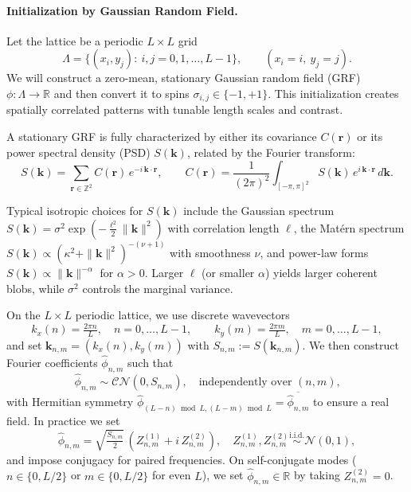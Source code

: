 \documentclass[11pt,a4paper]{article}
\begin{document}
\paragraph{Initialization by Gaussian Random Field.}
Let the lattice be a periodic $L\times L$ grid
\begin{equation}
    \Lambda=\{(x_i,y_j):\ i,j=0,1,\dots,L-1\},\qquad (x_i=i,\ y_j=j).
\end{equation}
We will construct a zero-mean, stationary Gaussian random field (GRF) 
$\phi:\Lambda\to\mathbb{R}$ and then convert it to spins $\sigma_{i,j}\in\{-1,+1\}$. This initialization creates spatially correlated patterns with tunable length scales and contrast.

A stationary GRF is fully characterized by either its covariance $C(\mathbf{r})$ or its
power spectral density (PSD) $S(\mathbf{k})$, related by the Fourier transform:
\begin{equation}
S(\mathbf{k})=\sum_{\mathbf{r}\in\mathbb{Z}^2} C(\mathbf{r})\,e^{-i\,\mathbf{k}\cdot\mathbf{r}}\!,
\qquad
C(\mathbf{r})=\frac{1}{(2\pi)^2}\!\int_{[-\pi,\pi]^2} S(\mathbf{k})\,e^{i\,\mathbf{k}\cdot\mathbf{r}}\,d\mathbf{k}.
\end{equation}

Typical isotropic choices for $S(\mathbf{k})$ include the Gaussian spectrum
$S(\mathbf{k})=\sigma^2\exp(-\tfrac{\ell^2}{2}\|\mathbf{k}\|^2)$ with correlation length $\ell$,
the Matérn spectrum $S(\mathbf{k})\propto (\kappa^2+\|\mathbf{k}\|^2)^{-(\nu+1)}$ with smoothness $\nu$,
and power-law forms $S(\mathbf{k})\propto \|\mathbf{k}\|^{-\alpha}$ for $\alpha>0$. Larger $\ell$ (or smaller $\alpha$) yields larger coherent blobs, while $\sigma^2$ controls the marginal variance.

On the $L\times L$ periodic lattice, we use discrete wavevectors
\begin{equation}
k_x(n)=\tfrac{2\pi n}{L},\quad n=0,\dots,L-1, 
\qquad k_y(m)=\tfrac{2\pi m}{L},\quad m=0,\dots,L-1,
\end{equation}
and set $\mathbf{k}_{n,m}=(k_x(n),k_y(m))$ with $S_{n,m}:=S(\mathbf{k}_{n,m})$. We then construct Fourier coefficients $\widehat{\phi}_{n,m}$ such that
\begin{equation}
\widehat{\phi}_{n,m}\sim\mathcal{CN}(0,S_{n,m}),\quad\text{independently over $(n,m)$,}
\end{equation}
with Hermitian symmetry $\widehat{\phi}_{(L-n)\bmod L,(L-m)\bmod L}=\overline{\widehat{\phi}_{n,m}}$ to ensure a real field. In practice we set
\begin{equation}
\widehat{\phi}_{n,m}=\sqrt{\tfrac{S_{n,m}}{2}}\,(Z^{(1)}_{n,m}+i\,Z^{(2)}_{n,m}),\quad Z^{(1)}_{n,m},Z^{(2)}_{n,m}\overset{\text{i.i.d.}}{\sim}\mathcal{N}(0,1),
\end{equation}
and impose conjugacy for paired frequencies. On self-conjugate modes ($n\in\{0,L/2\}$ or $m\in\{0,L/2\}$ for even $L$), we set $\widehat{\phi}_{n,m}\in\mathbb{R}$ by taking $Z^{(2)}_{n,m}=0$.
\end{document}
